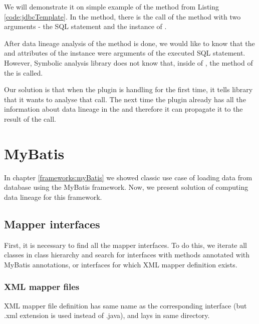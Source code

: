 We will demonstrate it on simple example of the  method from Listing \ref{code:jdbcTemplate}.
In the method, there is the call of the  method
with two arguments - the SQL statement and the instance of .

After data lineage analysis of the  method is done, we would like to know
that the  and  attributes of the  instance
were arguments of the executed SQL statement.
However, Symbolic analysis library does not know that, inside of ,
the  method of the  is called.

Our solution is that when the plugin is handling
 for the first time, it tells library
that it wants to analyse that  call.
The next time the plugin already has all the information
about data lineage in the 
and therefore it can propagate it to the result of the  call.




\section{MyBatis}

In chapter \ref{frameworks:myBatis} we showed classic use case of loading data from database
using the MyBatis framework. Now, we present solution of computing data lineage for this framework.



\subsection{Mapper interfaces}

First, it is necessary to find all the mapper interfaces.
To do this, we iterate all classes in class hierarchy and search 
for interfaces with methods annotated with MyBatis annotations,
or interfaces for which XML mapper definition exists.



\subsubsection{XML mapper files}

XML mapper file definition has same name as the corresponding interface
(but .xml extension is used instead of .java), and lays in same directory.

